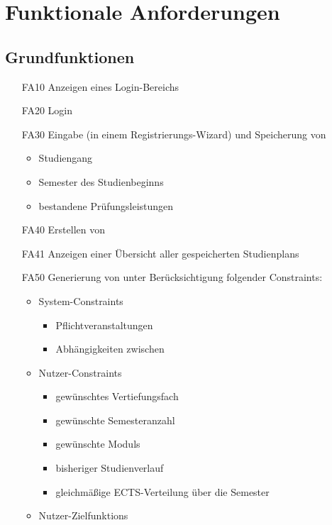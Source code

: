 \section{Funktionale Anforderungen}

	\subsection{Grundfunktionen}
	\begin{itemize}[nosep]	
		\item [FA10] Anzeigen eines Login-Bereichs
		\item [FA20] Login 
		\item [FA30]Eingabe (in einem Registrierungs-\gls{Wizard}) und Speicherung von
		\begin{itemize}[nosep]
			\item Studiengang
			\item \gls {Semester des Studienbeginns}
			\item bestandene Prüfungsleistungen
		\end{itemize}
		\item [FA40] Erstellen von 
		\item [FA41]Anzeigen einer Übersicht aller gespeicherten \glspl{Studienplan}
		\item [FA50] Generierung von  unter Berücksichtigung folgender \glspl{Constraint}:
			\begin{itemize}[nosep]
				\item \glspl{System-Constraint}
				\begin{itemize}[nosep]
					\item Pflichtveranstaltungen
					\item Abhängigkeiten zwischen 
				\end{itemize}
				\item \glspl{Nutzer-Constraint}
				\begin{itemize}[nosep]
					\item gewünschtes Vertiefungsfach
					\item gewünschte Semesteranzahl
					\item gewünschte \glspl{Modul}
					\item  bisheriger Studienverlauf
					\item gleichmäßige ECTS-Verteilung über die Semester
				\end{itemize}
				\item \glspl{Nutzer-Zielfunktion}

\end{itemize}
\end{itemize}
